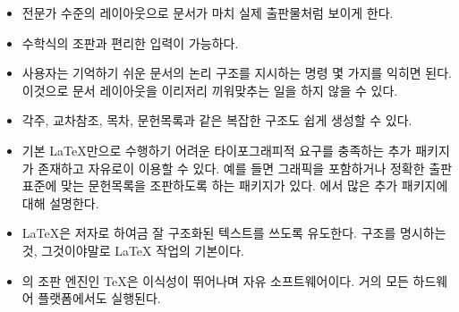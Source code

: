 \begin{itemize} \firmlist
\item 전문가 수준의 레이아웃으로 문서가 마치 실제 출판물처럼 보이게 한다.
\item 수학식의 조판과 편리한 입력이 가능하다.
\item 사용자는 기억하기 쉬운 문서의 논리 구조를 지시하는 명령 몇 가지를 익히면 된다. 이것으로 문서 레이아웃을 이리저리 끼워맞추는 일을 하지 않을 수 있다.
\item 각주, 교차참조, 목차, 문헌목록과 같은 복잡한 구조도 쉽게 생성할 수 있다.
\item 기본 \LaTeX 만으로 수행하기 어려운 타이포그래피적 요구를 충족하는 추가 패키지가 존재하고 자유로이 이용할 수 있다. 예를 들면 \PSi{} 그래픽을 포함하거나 정확한 출판 표준에 맞는 문헌목록을 조판하도록 하는 패키지가 있다. \companion 에서 많은 추가 패키지에 대해 설명한다.
\item \LaTeX 은 저자로 하여금 잘 구조화된 텍스트를 쓰도록 유도한다. 구조를 명시하는 것, 그것이야말로 \LaTeX{}  작업의 기본이다.
\item \LaTeXe 의 조판 엔진인 \TeX 은 이식성이 뛰어나며 자유 소프트웨어이다. 거의 모든 하드웨어 플랫폼에서도 실행된다.

\end{itemize}


